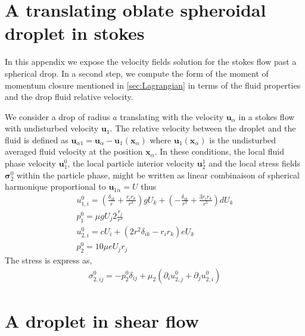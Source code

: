 \section{A translating oblate spheroidal droplet in stokes}

In this appendix we expose the velocity fields solution for the stokes flow past a spherical drop. 
In a second step, we compute the form of the moment of momentum closure mentioned in \ref{sec:Lagrangian} in terms of the fluid properties and the drop fluid relative velocity.

We consider a drop of radius $a$ translating with the velocity $\textbf{u}_\alpha$ in a stokes flow with undisturbed velocity $\textbf{u}_1$.
The relative velocity between the droplet and the fluid is defined as $\textbf{u}_{\alpha 1}= \textbf{u}_\alpha - \textbf{u}_1(\textbf{x}_\alpha)$ where $\textbf{u}_1(\textbf{x}_\alpha)$ is the undisturbed averaged fluid velocity at the position $\textbf{x}_\alpha$. 
In these conditions, the local fluid phase velocity $\textbf{u}_1^0$, the local particle interior velocity $\textbf{u}_2^1$ and the local stress fields $\bm\sigma_2^0$ within the particle phase, might be written as linear combinaison of spherical harmonique proportional to $\textbf{u}_{1\alpha} = U$ thus
\begin{align*}
    u_{1,i}^0
    = \left(\frac{\delta_{ik}}{r} + \frac{r_ir_k}{r^3}\right)  g U_k
    + \left(-\frac{\delta_{ik}}{r^3} + \frac{3r_ir_k}{r^5}\right)  d U_k\\
    p_1^0 = 
    \mu g U_j 2\frac{r_j}{r^3}\\
    u_{2,i}^0
    = c U_i
    + \left(2 r^2 \delta_{ik} - r_ir_k\right) e U_k\\
    p_2^0 
    = 10\mu e U_j r_j
\end{align*}
The stress is express as, 
\begin{align*}
    \sigma_{2,ij}^0 
    = - p_2^0 \delta_{ij}
    +\mu_2 (\partial_i u_{2,j}^0 + \partial_j u_{2,i}^0)
\end{align*}

\section{A droplet in shear flow}

